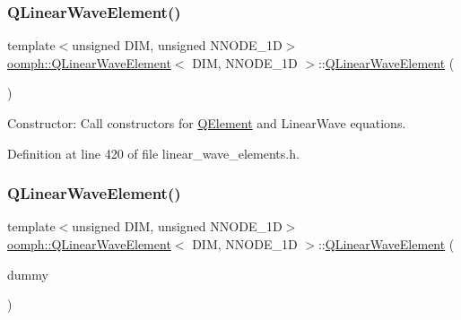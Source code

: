 \subsubsection{\texorpdfstring{Q\+Linear\+Wave\+Element()}{QLinearWaveElement()}\hspace{0.1cm}{\footnotesize\ttfamily [1/2]}}
{\footnotesize\ttfamily template$<$unsigned D\+IM, unsigned N\+N\+O\+D\+E\+\_\+1D$>$ \\
\hyperlink{classoomph_1_1QLinearWaveElement}{oomph\+::\+Q\+Linear\+Wave\+Element}$<$ D\+IM, N\+N\+O\+D\+E\+\_\+1D $>$\+::\hyperlink{classoomph_1_1QLinearWaveElement}{Q\+Linear\+Wave\+Element} (\begin{DoxyParamCaption}{ }\end{DoxyParamCaption})\hspace{0.3cm}{\ttfamily [inline]}}



Constructor\+: Call constructors for \hyperlink{classoomph_1_1QElement}{Q\+Element} and Linear\+Wave equations. 



Definition at line 420 of file linear\+\_\+wave\+\_\+elements.\+h.

\mbox{\label{classoomph_1_1QLinearWaveElement_a0379e5690ec0f285d0e6281204f357d5}} 
\subsubsection{\texorpdfstring{Q\+Linear\+Wave\+Element()}{QLinearWaveElement()}\hspace{0.1cm}{\footnotesize\ttfamily [2/2]}}
{\footnotesize\ttfamily template$<$unsigned D\+IM, unsigned N\+N\+O\+D\+E\+\_\+1D$>$ \\
\hyperlink{classoomph_1_1QLinearWaveElement}{oomph\+::\+Q\+Linear\+Wave\+Element}$<$ D\+IM, N\+N\+O\+D\+E\+\_\+1D $>$\+::\hyperlink{classoomph_1_1QLinearWaveElement}{Q\+Linear\+Wave\+Element} (\begin{DoxyParamCaption}\item[{const \hyperlink{classoomph_1_1QLinearWaveElement}{Q\+Linear\+Wave\+Element}$<$ D\+IM, N\+N\+O\+D\+E\+\_\+1D $>$ \&}]{dummy }\end{DoxyParamCaption})\hspace{0.3cm}{\ttfamily [inline]}}



